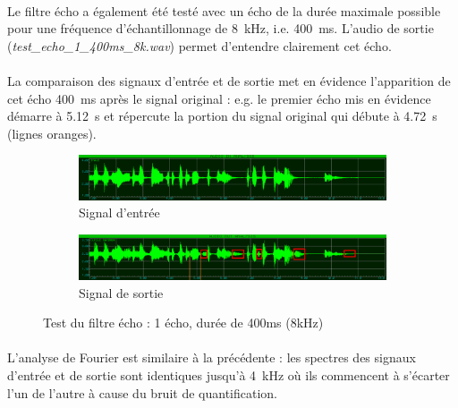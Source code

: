 \documentclass{article}
\begin{document}
    \paragraph{}
    Le filtre écho a également été testé avec un écho de la durée maximale possible pour une fréquence d'échantillonnage de \SI{8}{\kilo\hertz}, i.e. \SI{400}{\milli\second}. L'audio de sortie (\emph{test\_echo\_1\_400ms\_8k.wav}) permet d'entendre clairement cet écho.

    \paragraph{}
    La comparaison des signaux d'entrée et de sortie met en évidence l'apparition de cet écho \SI{400}{\milli\second} après le signal original : e.g. le premier écho mis en évidence démarre à \SI{5.12}{\second} et répercute la portion du signal original qui débute à \SI{4.72}{\second} (lignes oranges).

    \begin{figure}[H]
        \centering
        \begin{subfigure}[b]{\textwidth}
            \centering
            \includegraphics[width=\textwidth]{./images/in_echo_8k.png}
            \caption{Signal d'entrée}
        \end{subfigure}
        \begin{subfigure}[b]{\textwidth}
            \centering
            \includegraphics[width=\textwidth]{./images/out_echo_1_400ms_8k.png}
            \caption{Signal de sortie}
            \label{fig:echo_8k_out}
        \end{subfigure}
        \caption{Test du filtre écho : 1 écho, durée de 400ms (8kHz)}
    \end{figure}

    \paragraph{}
    L'analyse de Fourier est similaire à la précédente : les spectres des signaux d'entrée et de sortie sont identiques jusqu'à \SI{4}{\kilo\hertz} où ils commencent à s'écarter l'un de l'autre à cause du bruit de quantification.
\end{document}
